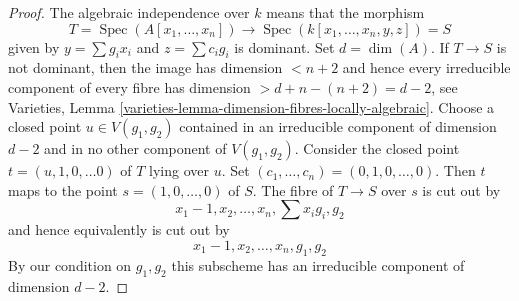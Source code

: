 \documentclass[10pt,a4paper]{amsart}
\theoremstyle{plain}
\theoremstyle{definition}
\theoremstyle{remark}
\numberwithin{equation}{subsection}
\def\Spec{\mathop{\mathrm{Spec}}}
\begin{document}
\begin{proof}
The algebraic independence over $k$ means that the morphism
$$
T = \Spec(A[x_1, \ldots, x_n])
\longrightarrow
\Spec(k[x_1, \ldots, x_n, y, z]) = S
$$
given by $y = \sum g_ix_i$ and $z = \sum c_ig_i$ is dominant.
Set $d = \dim(A)$. If $T \to S$ is not dominant, then the image
has dimension $< n + 2$ and hence every irreducible component
of every fibre has dimension $> d + n - (n + 2) = d - 2$, see
Varieties, Lemma
\ref{varieties-lemma-dimension-fibres-locally-algebraic}.
Choose a closed point $u \in V(g_1, g_2)$ contained in an irreducible component
of dimension $d - 2$ and in no other component of $V(g_1, g_2)$.
Consider the closed point $t = (u, 1, 0, \ldots 0)$
of $T$ lying over $u$. Set $(c_1, \ldots, c_n) = (0, 1, 0, \ldots, 0)$.
Then $t$ maps to the point $s = (1, 0, \ldots, 0)$ of $S$.
The fibre of $T \to S$ over $s$ is cut out by
$$
x_1 - 1, x_2, \ldots, x_n, \sum x_ig_i, g_2
$$
and hence equivalently is cut out by
$$
x_1 - 1, x_2, \ldots, x_n, g_1, g_2
$$
By our condition on $g_1, g_2$ this subscheme has an irreducible component
of dimension $d - 2$.
\end{proof}
\end{document}
